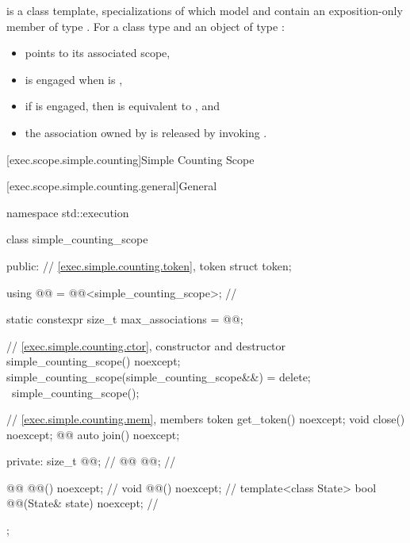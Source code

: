 \pnum
{} is a class template,
specializations of which model  and
contain an exposition-only member  of type .
For a class type  and
an object  of type :
\begin{itemize}
\item
{} points to its associated scope,
\item
{} is engaged when  is ,
\item
if  is engaged,
then  is equivalent to
, and
\item
the association owned by 
is released by invoking .
\end{itemize}

[exec.scope.simple.counting]{Simple Counting Scope}

[exec.scope.simple.counting.general]{General}

%
\begin{codeblock}
namespace std::execution {
  class simple_counting_scope {
  public:
    // \ref{exec.simple.counting.token}, token
    struct token;

    using @@ = @@<simple_counting_scope>;     // \expos

    static constexpr size_t max_associations = @@;

    // \ref{exec.simple.counting.ctor}, constructor and destructor
    simple_counting_scope() noexcept;
    simple_counting_scope(simple_counting_scope&&) = delete;
    ~simple_counting_scope();

    // \ref{exec.simple.counting.mem}, members
    token get_token() noexcept;
    void close() noexcept;
    @@ auto join() noexcept;

  private:
    size_t @@;                                       // \expos
    @@ @@;                             // \expos

    @@ @@() noexcept;                      // \expos
    void @@() noexcept;                       // \expos
    template<class State>
      bool @@(State& state) noexcept;    // \expos
  };
}
\end{codeblock}

